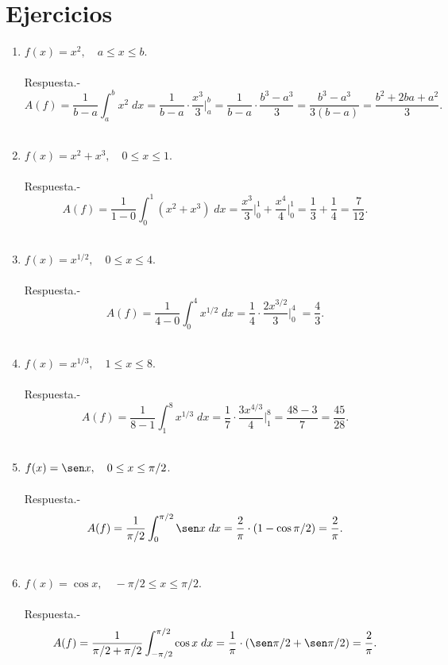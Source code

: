 \section{Ejercicios}

\begin{enumerate}

\item $f(x)=x^2,\quad a\leq x \leq b.$\\\\
    Respuesta.-\; $$A(f) = \dfrac{1}{b-a}\int_a^b x^2\; dx = \dfrac{1}{b-a} \cdot \dfrac{x^3}{3}\bigg|_a^b = \dfrac{1}{b-a}\cdot \dfrac{b^3 - a^3}{3}=\dfrac{b^3 - a^3}{3(b-a)} = \dfrac{b^2+2ba+a^2}{3}.$$\\

\item $f(x)=x^2+x^3, \quad 0\leq x \leq 1.$\\\\
    Respuesta.-\; $$A(f) = \dfrac{1}{1-0}\int_0^1 (x^2+x^3)\; dx = \dfrac{x^3}{3}\bigg|_0^1 + \dfrac{x^4}{4}\bigg|_0^1 = \dfrac{1}{3} + \dfrac{1}{4} = \dfrac{7}{12}.$$\\

\item $f(x)=x^{1/2},\quad 0\leq x \leq 4.$\\\\
    Respuesta.-\; $$A(f)=\dfrac{1}{4-0}\int_0^4 x^{1/2}\; dx = \dfrac{1}{4}\cdot \dfrac{2x^{3/2}}{3}\bigg|_0^4\; = \dfrac{4}{3}.$$\\

\item $f(x)=x^{1/3},\quad 1\leq x \leq 8.$\\\\
    Respuesta.-\; $$A(f) = \dfrac{1}{8-1}\int_1^8 x^{1/3}\; dx = \dfrac{1}{7}\cdot \dfrac{3x^{4/3}}{4}\bigg|_1^8 = \dfrac{48-3}{7} = \dfrac{45}{28}.$$\\ 

\item $f(x)=\sen x,\quad 0\leq x \leq \pi/2$.\\\\
    Respuesta.-\; $$A(f)=\dfrac{1}{\pi/2}\int_0^{\pi/2} \sen x\; dx = \dfrac{2}{\pi}\cdot (1-\cos \pi/2) = \dfrac{2}{\pi}.$$\\

\item $f(x)=\cos x,\quad -\pi/2\leq x \leq \pi/2.$\\\\
    Respuesta.-\; $$A(f)=\dfrac{1}{\pi/2 + \pi/2}\int_{-\pi/2}^{\pi/2} \cos x\; dx = \dfrac{1}{\pi}\cdot (\sen \pi/2 + \sen \pi/2) = \dfrac{2}{\pi}.$$\\


\end{enumerate}
